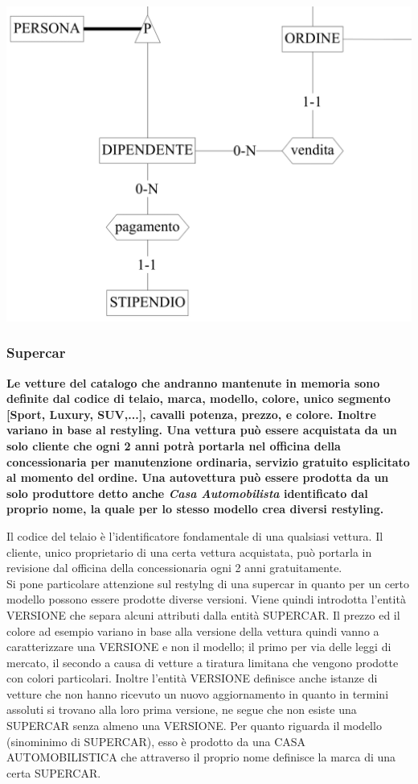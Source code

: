 \documentclass[11pt]{article}
\begin{document}
\begin{center}
    \includegraphics[width=\linewidth]{images/partialSchemes/dipendente.png}
\end{center}

\subsubsection{Supercar}
\textbf{Le vetture del catalogo che andranno mantenute in memoria sono definite
dal codice di telaio, marca, modello, colore, unico segmento [Sport, Luxury,
SUV,...], cavalli potenza, prezzo, e colore. Inoltre variano in base al
restyling. Una vettura può essere acquistata da un solo cliente che ogni 2 anni
potrà portarla nel officina della concessionaria per manutenzione ordinaria,
servizio gratuito esplicitato al momento del ordine. Una autovettura può essere
prodotta da un solo produttore detto anche \textit{Casa Automobilista}
identificato dal proprio nome, la quale per lo stesso modello crea diversi
restyling.}

Il codice del telaio è l'identificatore fondamentale di una qualsiasi vettura.
Il cliente, unico proprietario di una certa vettura acquistata, può portarla in
revisione dal officina della concessionaria ogni 2 anni gratuitamente.\\
Si pone particolare attenzione sul restylng di una supercar in quanto per un
certo modello possono essere prodotte diverse versioni. Viene quindi introdotta
l'entità VERSIONE che separa alcuni attributi dalla entità SUPERCAR. Il prezzo
ed il colore ad esempio variano in base alla versione della vettura quindi vanno
a caratterizzare una VERSIONE e non il modello; il primo per via delle leggi di
mercato, il secondo a causa di vetture a tiratura limitana che vengono prodotte
con colori particolari. Inoltre l'entità VERSIONE definisce anche istanze di
vetture che non hanno ricevuto un nuovo aggiornamento in quanto in termini
assoluti si trovano alla loro prima versione, ne segue che non esiste una
SUPERCAR senza almeno una VERSIONE. Per quanto riguarda il modello (sinominimo
di SUPERCAR), esso è prodotto da una CASA AUTOMOBILISTICA che attraverso il
proprio nome definisce la marca di una certa SUPERCAR.
\end{document}
